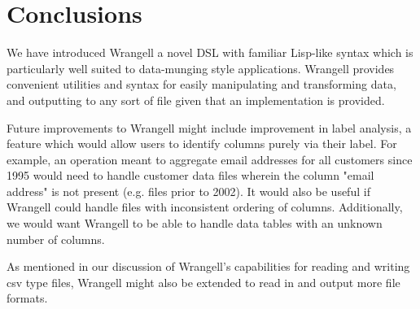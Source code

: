 \documentclass[preprint,nocopyrightspace]{sig-alternate}
\begin{document}
\section{Conclusions}
We have introduced Wrangell a novel DSL with familiar Lisp-like syntax which is particularly well suited to  data-munging style applications. Wrangell provides convenient utilities and syntax for easily manipulating and transforming data, and outputting to any sort of file given that an implementation is provided.

Future improvements to Wrangell might include improvement in label analysis, a feature which would allow users to identify columns purely via their label. For example, an operation meant to aggregate email addresses for all customers since 1995 would need to handle customer data files wherein the column "email address" is not present (e.g. files prior to 2002). It would also be useful if Wrangell could handle files with inconsistent ordering of columns. Additionally, we would want Wrangell to be able to handle data tables with an unknown number of columns. 

As mentioned in our discussion of Wrangell's capabilities for reading and writing csv type files, Wrangell might also be extended to read in and output more file formats.  



\end{document}
